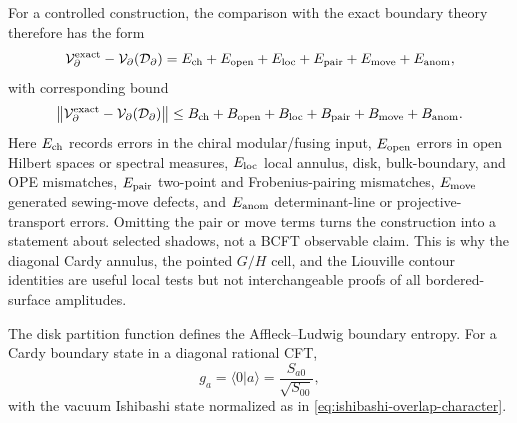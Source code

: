 \begin{construction}
For a controlled construction, the comparison with the exact boundary theory
therefore has the form
\begin{equation}
  \mathcal V_{\partial}^{\rm exact}
  -
  \mathcal V_{\partial}(\mathcal D_\partial)
  =
  E_{\rm ch}
  +E_{\rm open}
  +E_{\rm loc}
  +E_{\rm pair}
  +E_{\rm move}
  +E_{\rm anom},
  \label{eq:bcft-boundary-observable-vector-residual}
\end{equation}
with corresponding bound
\begin{equation}
  \left\|
    \mathcal V_{\partial}^{\rm exact}
    -
    \mathcal V_{\partial}(\mathcal D_\partial)
  \right\|
  \le
  B_{\rm ch}
  +B_{\rm open}
  +B_{\rm loc}
  +B_{\rm pair}
  +B_{\rm move}
  +B_{\rm anom}.
  \label{eq:bcft-boundary-observable-vector-bound}
\end{equation}
Here \(E_{\rm ch}\) records errors in the chiral modular/fusing input,
\(E_{\rm open}\) errors in open Hilbert spaces or spectral measures,
\(E_{\rm loc}\) local annulus, disk, bulk-boundary, and OPE mismatches,
\(E_{\rm pair}\) two-point and Frobenius-pairing mismatches,
\(E_{\rm move}\) generated sewing-move defects, and \(E_{\rm anom}\)
determinant-line or projective-transport errors.  Omitting the pair or move
terms turns the construction into a statement about selected shadows, not a
BCFT observable claim.  This is why the diagonal Cardy annulus, the pointed
\(G/H\) cell, and the Liouville contour identities are useful local tests but
not interchangeable proofs of all bordered-surface amplitudes.
\end{construction}

The disk partition function defines the Affleck--Ludwig boundary entropy.
For a Cardy boundary state in a diagonal rational CFT,
\begin{equation}
  g_a
  =
  \langle0|a\rangle
  =
  \frac{S_{a0}}{\sqrt{S_{00}}},
  \label{eq:cardy-boundary-entropy}
\end{equation}
with the vacuum Ishibashi state normalized as in
\eqref{eq:ishibashi-overlap-character}.

